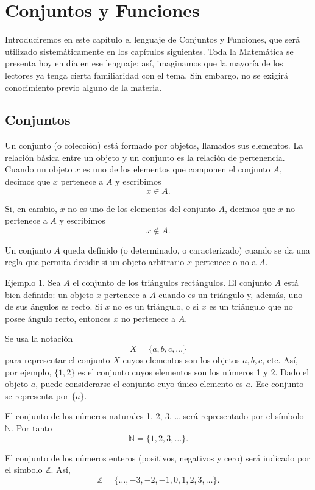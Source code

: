 \chapter{Conjuntos y Funciones}

Introduciremos en este capítulo el lenguaje de Conjuntos y Funciones, que será utilizado sistemáticamente en los capítulos siguientes. Toda la Matemática se presenta hoy en día en ese lenguaje; así, imaginamos que la mayoría de los lectores ya tenga cierta familiaridad con el tema. Sin embargo, no se exigirá conocimiento previo alguno de la materia.

\section{Conjuntos}

Un conjunto (o colección) está formado por objetos, llamados sus elementos. La relación básica entre un objeto y un conjunto es la relación de pertenencia. Cuando un objeto \( x \) es uno de los elementos que componen el conjunto \( A \), decimos que \( x \) pertenece a \( A \) y escribimos
\[ x \in A. \]

Si, en cambio, \( x \) no es uno de los elementos del conjunto \( A \), decimos que \( x \) no pertenece a \( A \) y escribimos
\[ x \notin A. \]

Un conjunto \( A \) queda definido (o determinado, o caracterizado) cuando se da una regla que permita decidir si un objeto arbitrario \( x \) pertenece o no a \( A \).

Ejemplo 1. Sea \( A \) el conjunto de los triángulos rectángulos. El conjunto \( A \) está bien definido: un objeto \( x \) pertenece a \( A \) cuando es un triángulo y, además, uno de sus ángulos es recto. Si \( x \) no es un triángulo, o si \( x \) es un triángulo que no posee ángulo recto, entonces \( x \) no pertenece a \( A \).

Se usa la notación
\[ X = \{a, b, c, \ldots\} \]
para representar el conjunto \( X \) cuyos elementos son los objetos \( a, b, c \), etc. Así, por ejemplo, \( \{1, 2\} \) es el conjunto cuyos elementos son los números 1 y 2. Dado el objeto \( a \), puede considerarse el conjunto cuyo único elemento es \( a \). Ese conjunto se representa por \( \{a\} \).

El conjunto de los números naturales 1, 2, 3, … será representado por el símbolo \( \mathbb{N} \). Por tanto
\[ \mathbb{N} = \{1, 2, 3, \ldots\}. \]

El conjunto de los números enteros (positivos, negativos y cero) será indicado por el símbolo \( \mathbb{Z} \). Así,
\[ \mathbb{Z} = \{\ldots, -3, -2, -1, 0, 1, 2, 3, \ldots\}. \]

